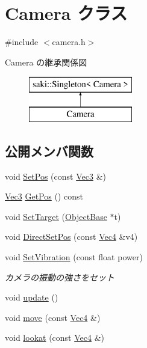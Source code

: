 \hypertarget{class_camera}{}\section{Camera クラス}
\label{class_camera}


{\ttfamily \#include $<$camera.\+h$>$}

Camera の継承関係図\begin{figure}[H]
\begin{center}
\leavevmode
\includegraphics[height=2.000000cm]{class_camera}
\end{center}
\end{figure}
\subsection*{公開メンバ関数}
\begin{DoxyCompactItemize}
\item 
void \mbox{\hyperlink{class_camera_a3acf6b8cbfb800859e4f06d1e44bea72}{Set\+Pos}} (const \mbox{\hyperlink{common_8h_ab1cb35b3a17c398d8ef71d5f779808bf}{Vec3}} \&)
\item 
\mbox{\hyperlink{common_8h_ab1cb35b3a17c398d8ef71d5f779808bf}{Vec3}} \mbox{\hyperlink{class_camera_af2812a7f744fc11a5481b791d5d66087}{Get\+Pos}} () const
\item 
void \mbox{\hyperlink{class_camera_a7336f8f6c9145bee1ce6b1f16f0aaee4}{Set\+Target}} (\mbox{\hyperlink{class_object_base}{Object\+Base}} $\ast$t)
\item 
void \mbox{\hyperlink{class_camera_accd0432b75906777ddd6799f51d1fb44}{Direct\+Set\+Pos}} (const \mbox{\hyperlink{common_8h_a0eafa16de452739414b9c28b2d6cfa97}{Vec4}} \&v4)
\item 
void \mbox{\hyperlink{class_camera_a09492c284cfd0a909d6084297c577e03}{Set\+Vibration}} (const float power)
\begin{DoxyCompactList}\small\item\em カメラの振動の強さをセット \end{DoxyCompactList}\item 
void \mbox{\hyperlink{class_camera_a42cda7239981a5618660d04bd5893556}{update}} ()
\item 
void \mbox{\hyperlink{class_camera_a79b68d3c6aef17e7962d9e517b2a42c7}{move}} (const \mbox{\hyperlink{common_8h_a0eafa16de452739414b9c28b2d6cfa97}{Vec4}} \&)
\item 
void \mbox{\hyperlink{class_camera_ad4e54f55f6423c16cc42476c9ed359cf}{lookat}} (const \mbox{\hyperlink{common_8h_a0eafa16de452739414b9c28b2d6cfa97}{Vec4}} \&)
\end{DoxyCompactItemize}
